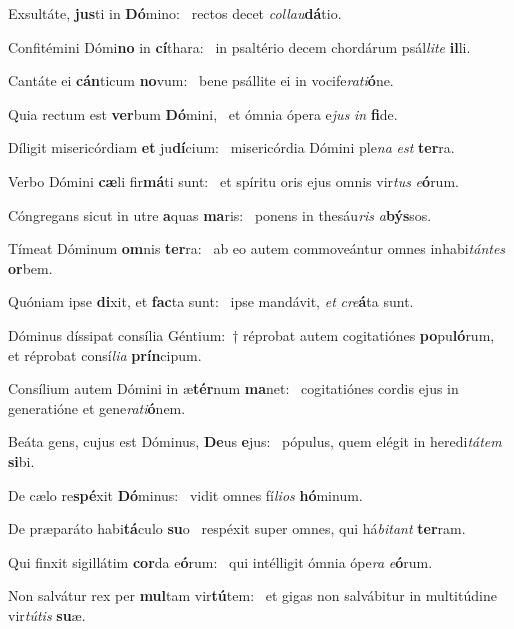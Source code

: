 \item Exsultáte, \textbf{jus}ti in \textbf{Dó}mino:~\psstar{} rectos decet \textit{collau}\textbf{dá}tio.
\item Confitémini Dómi\textbf{no} in \textbf{cí}thara:~\psstar{} in psaltério decem chordárum psál\textit{lite} \textbf{il}li.
\item Cantáte ei \textbf{cán}ticum \textbf{no}vum:~\psstar{} bene psállite ei in vocife\textit{rati}\textbf{ó}ne.
\item Quia rectum est \textbf{ver}bum \textbf{Dó}mini,~\psstar{} et ómnia ópera e\textit{jus} \textit{in} \textbf{fi}de.
\item Díligit misericórdiam \textbf{et} ju\textbf{dí}cium:~\psstar{} misericórdia Dómini ple\textit{na} \textit{est} \textbf{ter}ra.
\item Verbo Dómini \textbf{cæ}li fir\textbf{má}ti sunt:~\psstar{} et spíritu oris ejus omnis vir\textit{tus} \textit{e}\textbf{ó}rum.
\item Cóngregans sicut in utre \textbf{a}quas \textbf{ma}ris:~\psstar{} ponens in thesáu\textit{ris} \textit{a}\textbf{býs}sos.
\item Tímeat Dóminum \textbf{om}nis \textbf{ter}ra:~\psstar{} ab eo autem commoveántur omnes inhabi\textit{tántes} \textbf{or}bem.
\item Quóniam ipse \textbf{di}xit, et \textbf{fac}ta sunt:~\psstar{} ipse mandávit, \textit{et} \textit{cre}\textbf{á}ta sunt.
\item Dóminus díssipat consília Géntium:~† réprobat autem cogitatiónes \textbf{po}pu\textbf{ló}rum,~\psstar{} et réprobat consí\textit{lia} \textbf{prín}cipum.
\item Consílium autem Dómini in æ\textbf{tér}num \textbf{ma}net:~\psstar{} cogitatiónes cordis ejus in generatióne et gene\textit{rati}\textbf{ó}nem.
\item Beáta gens, cujus est Dóminus, \textbf{De}us \textbf{e}jus:~\psstar{} pópulus, quem elégit in heredi\textit{tátem} \textbf{si}bi.
\item De cælo re\textbf{spé}xit \textbf{Dó}minus:~\psstar{} vidit omnes fí\textit{lios} \textbf{hó}minum.
\item De præparáto habi\textbf{tá}culo \textbf{su}o~\psstar{} respéxit super omnes, qui há\textit{bitant} \textbf{ter}ram.
\item Qui finxit sigillátim \textbf{cor}da e\textbf{ó}rum:~\psstar{} qui intélligit ómnia ópe\textit{ra} \textit{e}\textbf{ó}rum.
\item Non salvátur rex per \textbf{mul}tam vir\textbf{tú}tem:~\psstar{} et gigas non salvábitur in multitúdine vir\textit{tútis} \textbf{su}æ.
